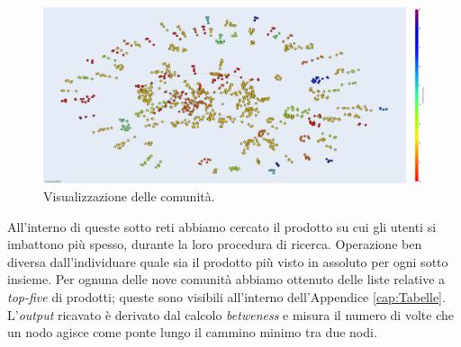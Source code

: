 			\begin{figure} [h]
				\includegraphics[width=\textwidth]{Figure/communities}
				\caption{Visualizzazione delle comunità.}
				\label{fig:communities}
			\end{figure} 
		
			All'interno di queste sotto reti abbiamo cercato il prodotto su cui gli utenti si imbattono più spesso, durante la loro procedura di ricerca. Operazione ben diversa dall'individuare quale sia il prodotto più visto in assoluto per ogni sotto insieme. Per ognuna delle nove comunità abbiamo ottenuto delle liste relative a \textit{top-five} di prodotti; queste sono visibili all'interno dell'Appendice \ref{cap:Tabelle}. L'\textit{output} ricavato è derivato dal calcolo \textit{betweness} e misura il numero di volte che un nodo agisce come ponte lungo il cammino minimo tra due nodi.
			